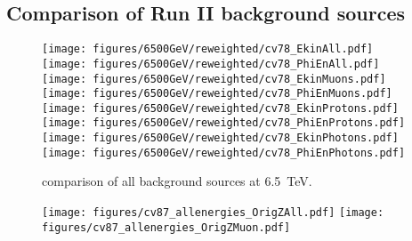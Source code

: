 
\subsection{Comparison of Run II background sources}
\begin{figure}
\begin{center}
  \texttt{[image: figures/6500GeV/reweighted/cv78\_EkinAll.pdf]}
  \texttt{[image: figures/6500GeV/reweighted/cv78\_PhiEnAll.pdf]}
  \texttt{[image: figures/6500GeV/reweighted/cv78\_EkinMuons.pdf]}
  \texttt{[image: figures/6500GeV/reweighted/cv78\_PhiEnMuons.pdf]}
  \texttt{[image: figures/6500GeV/reweighted/cv78\_EkinProtons.pdf]}
  \texttt{[image: figures/6500GeV/reweighted/cv78\_PhiEnProtons.pdf]}
 \texttt{[image: figures/6500GeV/reweighted/cv78\_EkinPhotons.pdf]}
 \texttt{[image: figures/6500GeV/reweighted/cv78\_PhiEnPhotons.pdf]}
\end{center}
\vspace{-0.6cm}
 \caption{comparison of all background sources at 6.5~TeV.
  \label{compAllBKG_6.5}}
\end{figure}

\begin{figure}
\begin{center}
  \texttt{[image: figures/cv87\_allenergies\_OrigZAll.pdf]}
  \texttt{[image: figures/cv87\_allenergies\_OrigZMuon.pdf]}
\end{center}
\vspace{-0.6cm}
 \caption{
  \label{fig:OrigZMuonAllEn}} 
\end{figure}

